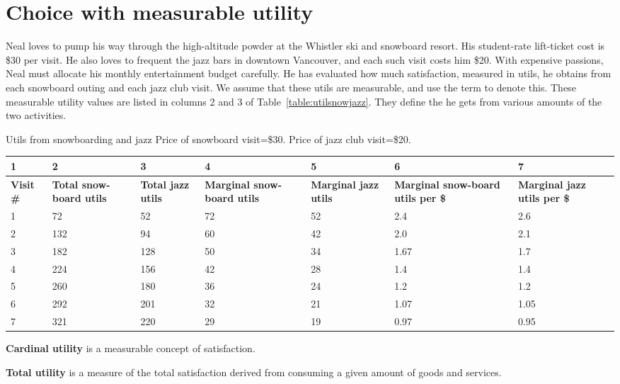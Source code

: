 \section{Choice with measurable utility}\label{sec:choicemeasureutility}

Neal loves to pump his way through the high-altitude powder at the Whistler ski and snowboard resort. His student-rate lift-ticket cost is \$30 per visit. He also loves to frequent the jazz bars in downtown Vancouver, and each such visit costs him \$20. With expensive passions, Neal must allocate his monthly entertainment budget carefully. He has evaluated how much satisfaction, measured in utils, he obtains from each snowboard outing and each jazz club visit. We assume that these utils are measurable, and use the term  to denote this. These measurable utility values are listed in columns 2 and 3 of Table~\ref{table:utilsnowjazz}. They define the  he gets from various amounts of the two activities.

\begin{Table}{25em}{Utils from snowboarding and jazz \label{table:utilsnowjazz}}{\centering Price of snowboard visit=\$30. Price of jazz club visit=\$20.}
\begin{tabu} to \linewidth {|X[0.5,c]X[1,c]X[1,c]X[1,c]X[1,c]X[1,c]X[1,c]|} \hline 
{}	1 & 2 & 3 & 4 & 5 & 6 & 7 \\ \hline 
\textbf{Visit \#} & \textbf{Total snow-board utils} & \textbf{Total jazz utils} & \textbf{Marginal snow-board utils} & \textbf{Marginal jazz utils} & \textbf{Marginal snow-board utils per \$} & \textbf{Marginal jazz utils per \$} \\ 
	1 & 72 	& 52 	& 72 & 52 & 2.4	& 2.6 	\\
						2 & 132 & 94 	& 60 & 42 & 2.0 & 2.1 	\\
	3 & 182 & 128 & 50 & 34 & 1.67 	& 1.7 	\\ 
						4 & 224 & 156 & 42 & 28 & 1.4 	& 1.4	\\ 
	5 & 260 & 180 & 36 & 24 & 1.2 	& 1.2	\\
						6 & 292 & 201 & 32 & 21 & 1.07 	& 1.05	\\
	7 & 321 & 220 & 29 & 19 & 0.97 	& 0.95	\\ \hline 
\end{tabu}
\end{Table}

\begin{DefBox}
\textbf{Cardinal utility} is a measurable concept of satisfaction.

\textbf{Total utility} is a measure of the total satisfaction derived from consuming a given amount of goods and services.
\end{DefBox}

